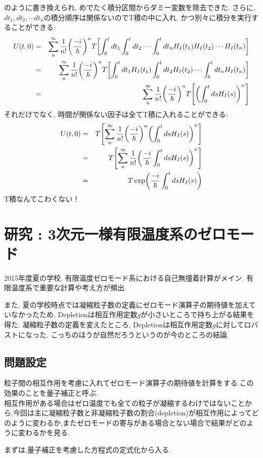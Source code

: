 \documentclass[10.5pt,a4paper]{jreport}
\begin{document}
のように書き換えられ, めでたく積分区間からダミー変数を除去できた. さらに, $dt_1, dt_2, \cdots dt_n$の積分順序は関係ないのでT積の中に入れ, かつ別々に積分を実行することができる:
\begin{eqnarray}
  U(t, 0) &=& \sum_{n}^\infty\frac{1}{n!}\qty(\frac{-i}{\hbar})^nT\qty[\int_0^t dt_1 \int_0^{t} dt_2\cdots\int_0^{t} dt_nH_I(t_1)H_I(t_2)\cdots H_I(t_n)]\\
  &=& \sum_{n}^\infty\frac{1}{n!}\qty(\frac{-i}{\hbar})^nT\qty[\int_0^t dt_1H_I(t_1) \int_0^{t} dt_2H_I(t_2)\cdots\int_0^{t} dt_nH_I(t_n)]\\
  &=& \sum_{n}^\infty\frac{1}{n!}\qty(\frac{-i}{\hbar})^nT\qty[\qty(\int_0^t ds H_I(s))^n]
\end{eqnarray}
それだけでなく, 時間が関係ない因子は全てT積に入れることができる:
\begin{eqnarray}
  U(t, 0) &=& T\qty[\sum_{n}^\infty\frac{1}{n!}\qty(\frac{-i}{\hbar})^n\qty(\int_0^t ds H_I(s))^n]\\
  &=& T\qty[\sum_{n}^\infty\frac{1}{n!}\qty(\frac{-i}{\hbar}\int_0^t ds H_I(s))^n]\\
  &=& T\exp(\frac{-i}{\hbar}\int_0^t ds H_I(s))
\end{eqnarray}
T積なんてこわくない！
\newpage
\chapter{研究 : 3次元一様有限温度系のゼロモード}
2015年度夏の学校. 有限温度ゼロモード系における自己無撞着計算がメイン. 有限温度系で重要な計算や考え方が頻出.

また, 夏の学校時点では凝縮粒子数の定義にゼロモード演算子の期待値を加えていなかったため, Depletionは相互作用定数$g$が小さいところで持ち上がる結果を得た. 凝縮粒子数の定義を変えたところ, Depletionは相互作用定数$g$に対してロバストになった. こっちのほうが自然だろうというのが今のところの結論. 
\section{問題設定}
粒子間の相互作用を考慮に入れてゼロモード演算子の期待値を計算をする.この効果のことを量子補正と呼ぶ.\\
相互作用がある場合はゼロ温度でも全ての粒子が凝縮するわけではないことから,今回は主に凝縮粒子数と非凝縮粒子数の割合(depletion)が相互作用によってどのように変わるか,またゼロモードの寄与がある場合とない場合で結果がどのように変わるかを見る.

まずは,量子補正を考慮した方程式の定式化から入る.
\end{document}
